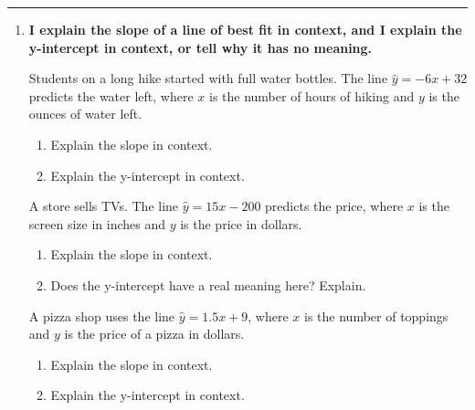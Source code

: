 \documentclass[11pt]{article}
\newcommand{\lessonhead}[1]{\par\vspace{0.6em}{\large\bfseries #1}\par\vspace{0.25em}\hrule\vspace{0.6em}}
\newcommand{\goal}[1]{\textbf{#1}\par\vspace{0.35em}}
\begin{document}
\newpage
\lessonhead{4.2 - Slope, Intercept, and Correlation}
\begin{enumerate}[resume]

\item \goal{I explain the slope of a line of best fit in context, and I explain the y-intercept in context, or tell why it has no meaning.}
Students on a long hike started with full water bottles. The line $\hat{y} = -6x + 32$ predicts the water left, where $x$ is the number of hours of hiking and $y$ is the ounces of water left.
\begin{enumerate}
  \item Explain the slope in context.

  \work{2.5em}
  \item Explain the y-intercept in context.

  \work{2.5em}
\end{enumerate}

\vspace{0.6em}
A store sells TVs. The line $\hat{y} = 15x - 200$ predicts the price, where $x$ is the screen size in inches and $y$ is the price in dollars.
\begin{enumerate}[start=3]
  \item Explain the slope in context.

  \work{2.5em}
  \item Does the y-intercept have a real meaning here? Explain.

  \work{2.5em}
\end{enumerate}

\vspace{0.6em}
A pizza shop uses the line $\hat{y} = 1.5x + 9$, where $x$ is the number of toppings and $y$ is the price of a pizza in dollars.
\begin{enumerate}[start=5]
  \item Explain the slope in context.

  \work{2.5em}
  \item Explain the y-intercept in context.


\end{enumerate}
\end{enumerate}
\end{document}
